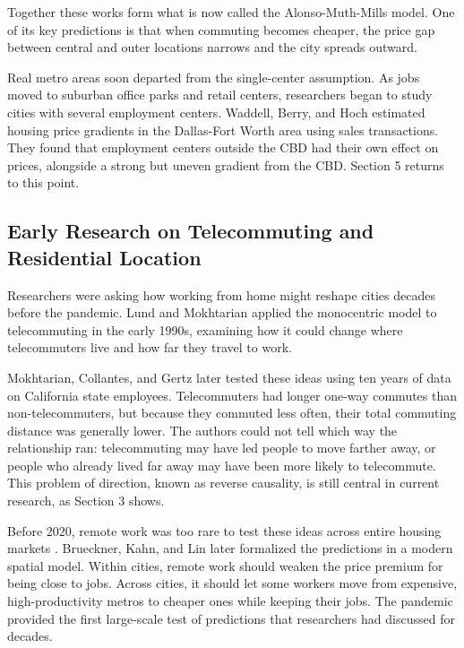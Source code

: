 \documentclass[11pt]{article}
\begin{document}
Together these works form what is now called the Alonso-Muth-Mills model. One of its key predictions is that when commuting becomes cheaper, the price gap between central and outer locations narrows and the city spreads outward.

Real metro areas soon departed from the single-center assumption. As jobs moved to suburban office parks and retail centers, researchers began to study cities with several employment centers. Waddell, Berry, and Hoch \cite{waddell1993residential} estimated housing price gradients in the Dallas-Fort Worth area using sales transactions. They found that employment centers outside the CBD had their own effect on prices, alongside a strong but uneven gradient from the CBD. Section 5 returns to this point.

\subsection{Early Research on Telecommuting and Residential Location}

Researchers were asking how working from home might reshape cities decades before the pandemic. Lund and Mokhtarian \cite{lund1994telecommuting} applied the monocentric model to telecommuting in the early 1990s, examining how it could change where telecommuters live and how far they travel to work.

Mokhtarian, Collantes, and Gertz \cite{mokhtarian2004telecommuting} later tested these ideas using ten years of data on California state employees. Telecommuters had longer one-way commutes than non-telecommuters, but because they commuted less often, their total commuting distance was generally lower. The authors could not tell which way the relationship ran: telecommuting may have led people to move farther away, or people who already lived far away may have been more likely to telecommute. This problem of direction, known as reverse causality, is still central in current research, as Section 3 shows.

Before 2020, remote work was too rare to test these ideas across entire housing markets \cite{barrero2021stick}. Brueckner, Kahn, and Lin \cite{brueckner2023spatial} later formalized the predictions in a modern spatial model. Within cities, remote work should weaken the price premium for being close to jobs. Across cities, it should let some workers move from expensive, high-productivity metros to cheaper ones while keeping their jobs. The pandemic provided the first large-scale test of predictions that researchers had discussed for decades.
\end{document}
